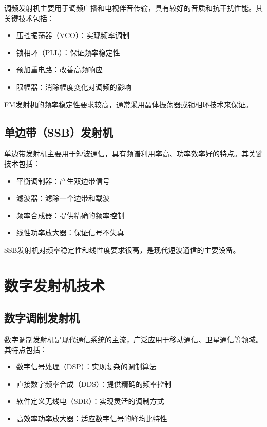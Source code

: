 \documentclass[12pt,UTF8]{ctexbook}
\begin{document}
调频发射机主要用于调频广播和电视伴音传输，具有较好的音质和抗干扰性能。其关键技术包括：

\begin{itemize}[leftmargin=3.5em]
    \item 压控振荡器（VCO）：实现频率调制
    \item 锁相环（PLL）：保证频率稳定性
    \item 预加重电路：改善高频响应
    \item 限幅器：消除幅度变化对调频的影响
\end{itemize}

FM发射机的频率稳定性要求较高，通常采用晶体振荡器或锁相环技术来保证。

\section{单边带（SSB）发射机}

单边带发射机主要用于短波通信，具有频谱利用率高、功率效率好的特点。其关键技术包括：

\begin{itemize}[leftmargin=3.5em]
    \item 平衡调制器：产生双边带信号
    \item 滤波器：滤除一个边带和载波
    \item 频率合成器：提供精确的频率控制
    \item 线性功率放大器：保证信号不失真
\end{itemize}

SSB发射机对频率稳定性和线性度要求很高，是现代短波通信的主要设备。

\chapter{数字发射机技术}

\section{数字调制发射机}

数字调制发射机是现代通信系统的主流，广泛应用于移动通信、卫星通信等领域。其特点包括：

\begin{itemize}[leftmargin=3.5em]
    \item 数字信号处理（DSP）：实现复杂的调制算法
    \item 直接数字频率合成（DDS）：提供精确的频率控制
    \item 软件定义无线电（SDR）：实现灵活的调制方式
    \item 高效率功率放大器：适应数字信号的峰均比特性
\end{itemize}
\end{document}
